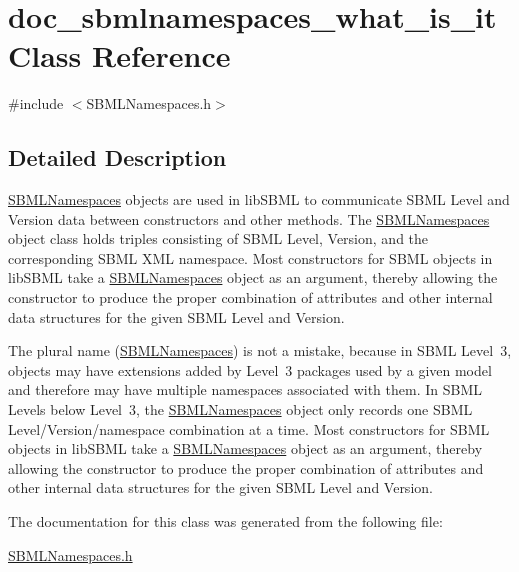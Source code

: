 \hypertarget{classdoc__sbmlnamespaces__what__is__it}{}\section{doc\+\_\+sbmlnamespaces\+\_\+what\+\_\+is\+\_\+it Class Reference}
\label{classdoc__sbmlnamespaces__what__is__it}


{\ttfamily \#include $<$S\+B\+M\+L\+Namespaces.\+h$>$}



\subsection{Detailed Description}
\begin{DoxyParagraph}{}
\hyperlink{class_s_b_m_l_namespaces}{S\+B\+M\+L\+Namespaces} objects are used in lib\+S\+B\+ML to communicate S\+B\+ML Level and Version data between constructors and other methods. The \hyperlink{class_s_b_m_l_namespaces}{S\+B\+M\+L\+Namespaces} object class holds triples consisting of S\+B\+ML Level, Version, and the corresponding S\+B\+ML X\+ML namespace. Most constructors for S\+B\+ML objects in lib\+S\+B\+ML take a \hyperlink{class_s_b_m_l_namespaces}{S\+B\+M\+L\+Namespaces} object as an argument, thereby allowing the constructor to produce the proper combination of attributes and other internal data structures for the given S\+B\+ML Level and Version.
\end{DoxyParagraph}
The plural name (\hyperlink{class_s_b_m_l_namespaces}{S\+B\+M\+L\+Namespaces}) is not a mistake, because in S\+B\+ML Level~3, objects may have extensions added by Level~3 packages used by a given model and therefore may have multiple namespaces associated with them. In S\+B\+ML Levels below Level~3, the \hyperlink{class_s_b_m_l_namespaces}{S\+B\+M\+L\+Namespaces} object only records one S\+B\+ML Level/\+Version/namespace combination at a time. Most constructors for S\+B\+ML objects in lib\+S\+B\+ML take a \hyperlink{class_s_b_m_l_namespaces}{S\+B\+M\+L\+Namespaces} object as an argument, thereby allowing the constructor to produce the proper combination of attributes and other internal data structures for the given S\+B\+ML Level and Version. 

The documentation for this class was generated from the following file\+:\begin{DoxyCompactItemize}
\item 
\hyperlink{_s_b_m_l_namespaces_8h}{S\+B\+M\+L\+Namespaces.\+h}\end{DoxyCompactItemize}
